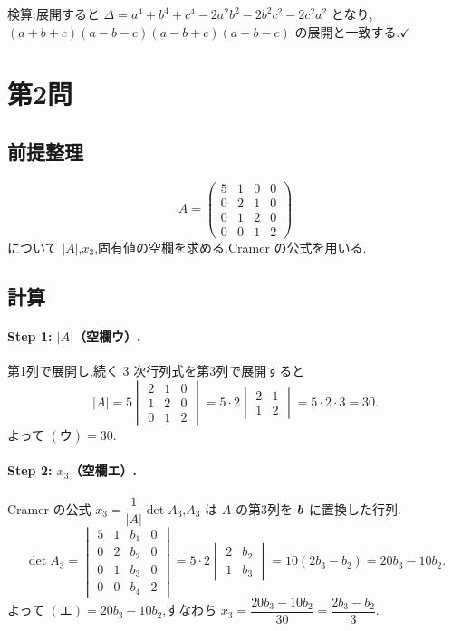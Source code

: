 \documentclass[11pt,a4paper]{article}
\begin{document}
検算:展開すると
$\Delta=a^4+b^4+c^4-2a^2b^2-2b^2c^2-2c^2a^2$ となり,
$(a+b+c)(a-b-c)(a-b+c)(a+b-c)$ の展開と一致する.$\checkmark$

\section*{第2問}

\subsection*{前提整理}

\[
A=\begin{pmatrix}5&1&0&0\\0&2&1&0\\0&1&2&0\\0&0&1&2\end{pmatrix}
\]
について $|A|$,$x_3$,固有値の空欄を求める.Cramer の公式を用いる.

\subsection*{計算}

\paragraph{Step 1: $|A|$（空欄ウ）.}
第1列で展開し,続く $3$ 次行列式を第3列で展開すると
\[
|A|=5\begin{vmatrix}2&1&0\\1&2&0\\0&1&2\end{vmatrix}
=5\cdot2\begin{vmatrix}2&1\\1&2\end{vmatrix}=5\cdot2\cdot3=30.
\]
よって $(\text{ウ})=30$.

\paragraph{Step 2: $x_3$（空欄エ）.}
Cramer の公式 $x_3=\dfrac{1}{|A|}\det A_3$,$A_3$ は $A$ の第3列を $\bm{b}$ に置換した行列.
\[
\det A_3=\begin{vmatrix}5&1&b_1&0\\0&2&b_2&0\\0&1&b_3&0\\0&0&b_4&2\end{vmatrix}
=5\cdot2\begin{vmatrix}2&b_2\\1&b_3\end{vmatrix}=10(2b_3-b_2)=20b_3-10b_2.
\]
よって $(\text{エ})=20b_3-10b_2$,すなわち $x_3=\dfrac{20b_3-10b_2}{30}=\dfrac{2b_3-b_2}{3}$.
\end{document}
